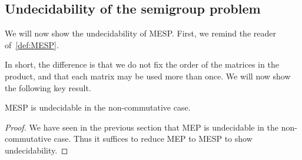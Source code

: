 \subsection{Undecidability of the semigroup problem}

We will now show the undecidability of MESP\@. First, we remind the reader of~\cref{def:MESP}.
\MESP*

In short, the difference is that we do not fix the order of the matrices in the product, and that each matrix may be used more than once. We will now show the following key result.

\begin{theorem}
  MESP is undecidable in the non-commutative case.
\end{theorem}

\begin{proof}
We have seen in the previous section that MEP is undecidable in the non-commutative
case. Thus it suffices to reduce MEP to MESP to show undecidability.


\end{proof}
